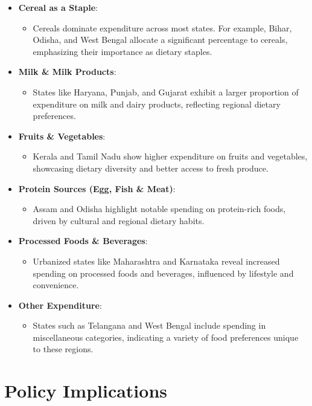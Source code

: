 \documentclass{article}
\begin{document}
\begin{itemize}
	\item \textbf{Cereal as a Staple}:
	\begin{itemize}
		\item Cereals dominate expenditure across most states. For example, Bihar, Odisha, and West Bengal allocate a significant percentage to cereals, emphasizing their importance as dietary staples.
	\end{itemize}
	\item \textbf{Milk \& Milk Products}:
	\begin{itemize}
		\item States like Haryana, Punjab, and Gujarat exhibit a larger proportion of expenditure on milk and dairy products, reflecting regional dietary preferences.
	\end{itemize}
	\item \textbf{Fruits \& Vegetables}:
	\begin{itemize}
		\item Kerala and Tamil Nadu show higher expenditure on fruits and vegetables, showcasing dietary diversity and better access to fresh produce.
	\end{itemize}
	\item \textbf{Protein Sources (Egg, Fish \& Meat)}:
	\begin{itemize}
		\item Assam and Odisha highlight notable spending on protein-rich foods, driven by cultural and regional dietary habits.
	\end{itemize}
	\item \textbf{Processed Foods \& Beverages}:
	\begin{itemize}
		\item Urbanized states like Maharashtra and Karnataka reveal increased spending on processed foods and beverages, influenced by lifestyle and convenience.
	\end{itemize}
	\item \textbf{Other Expenditure}:
	\begin{itemize}
		\item States such as Telangana and West Bengal include spending in miscellaneous categories, indicating a variety of food preferences unique to these regions.
	\end{itemize}
\end{itemize}

\section*{Policy Implications}
\end{document}
